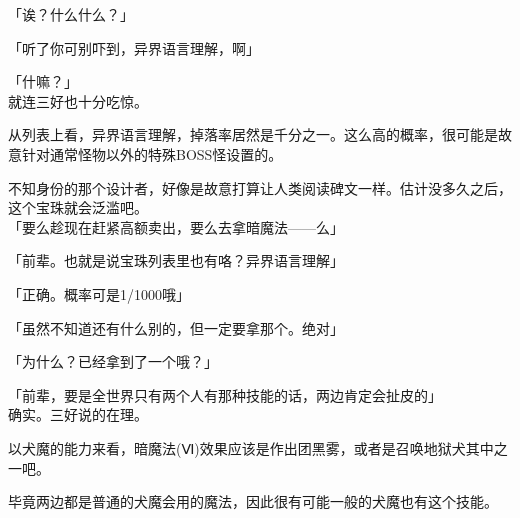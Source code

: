 「诶？什么什么？」

「听了你可别吓到，异界语言理解，啊」

「什嘛？」\\

就连三好也十分吃惊。

从列表上看，异界语言理解，掉落率居然是千分之一。这么高的概率，很可能是故意针对通常怪物以外的特殊BOSS怪设置的。

不知身份的那个设计者，好像是故意打算让人类阅读碑文一样。估计没多久之后，这个宝珠就会泛滥吧。\\

「要么趁现在赶紧高额卖出，要么去拿暗魔法——么」

「前辈。也就是说宝珠列表里也有咯？异界语言理解」

「正确。概率可是1/1000哦」

「虽然不知道还有什么别的，但一定要拿那个。绝对」

「为什么？已经拿到了一个哦？」

「前辈，要是全世界只有两个人有那种技能的话，两边肯定会扯皮的」\\

确实。三好说的在理。

以犬魔的能力来看，暗魔法(Ⅵ)效果应该是作出团黑雾，或者是召唤地狱犬其中之一吧。

毕竟两边都是普通的犬魔会用的魔法，因此很有可能一般的犬魔也有这个技能。\\

